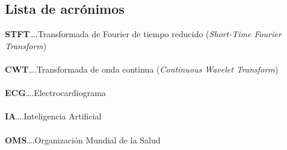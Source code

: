 \documentclass[12pt,a4paper,twoside]{book}
\begin{document}
%
%



\ifx\release\undefined
\else
	\newcommand{\acr}[2]{%
	\noindent\textbf{#1}\dots.\dotfill #2\\ \\
	}

	\newpage
	\thispagestyle{empty}
	\begin{large}
		\section*{Lista de acrónimos}
		\acr{STFT}{Transformada de Fourier de tiempo reducido (\emph{Short-Time Fourier Transform})}
		\acr{CWT}{Transformada de onda continua (\emph{Continuous Wavelet Transform})}
		\acr{ECG}{Electrocardiograma}
		\acr{IA}{Inteligencia Artificial}
		\acr{OMS}{Organización Mundial de la Salud}
	\end{large}	
	
\fi



\ifx\generaacronimos\undefined
\else

\fi

%
%

\end{document}
